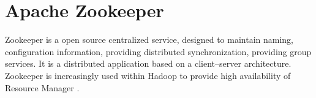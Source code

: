 \section{Apache Zookeeper}

Zookeeper is a open source centralized service, designed to maintain naming,
configuration information, providing distributed synchronization, providing
group services. It is a distributed application based on a client–server
architecture. Zookeeper is increasingly used within Hadoop to provide high
availability of Resource Manager \cite{hid-sp18-421-zookeeper}.

